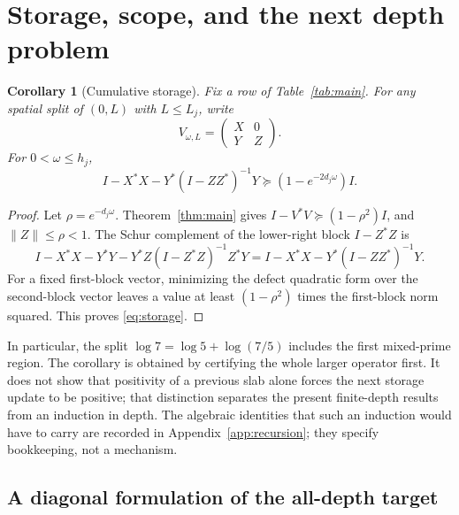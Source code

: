 \documentclass[11pt]{article}
\numberwithin{equation}{section}
\newtheorem{corollary}[theorem]{Corollary}
\theoremstyle{definition}
\theoremstyle{remark}
\newcommand{\norm}[1]{\lVert#1\rVert}
\begin{document}
\section{Storage, scope, and the next depth problem}\label{sec:storage}

\begin{corollary}[Cumulative storage]\label{cor:storage}
Fix a row of Table~\ref{tab:main}. For any spatial split of $(0,L)$ with
$L\le L_j$, write
\[
 V_{\omega,L}=\begin{pmatrix}X&0\\Y&Z\end{pmatrix}.
\]
For $0<\omega\le h_j$,
\begin{equation}\label{eq:storage}
 I-X^*X-Y^*(I-ZZ^*)^{-1}Y
 \succeq(1-e^{-2d_j\omega})I.
\end{equation}
\end{corollary}
\begin{proof}
Let $\rho=e^{-d_j\omega}$. Theorem~\ref{thm:main} gives
$I-V^*V\succeq(1-\rho^2)I$, and $\norm Z\le\rho<1$.
The Schur complement of the lower-right block $I-Z^*Z$ is
\[
 I-X^*X-Y^*Y-Y^*Z(I-Z^*Z)^{-1}Z^*Y
 =I-X^*X-Y^*(I-ZZ^*)^{-1}Y.
\]
For a fixed first-block vector, minimizing the defect quadratic form over
the second-block vector leaves a value at least
$(1-\rho^2)$ times the first-block norm squared. This proves
\eqref{eq:storage}.
\end{proof}

In particular, the split $\log7=\log5+\log(7/5)$ includes the first
mixed-prime region. The corollary is obtained by certifying the whole larger
operator first. It does not show that positivity of a previous slab alone
forces the next storage update to be positive; that distinction separates
the present finite-depth results from an induction in depth. The algebraic
identities that such an induction would have to carry are recorded in
Appendix~\ref{app:recursion}; they specify bookkeeping, not a mechanism.

\subsection{A diagonal formulation of the all-depth target}
\end{document}
